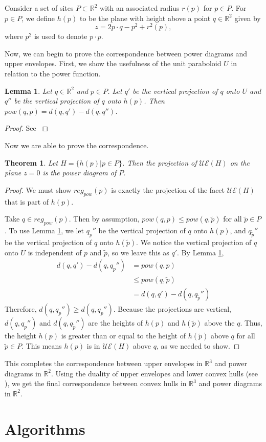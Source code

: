 \documentclass[12pt]{article}
\newtheorem{theorem}{Theorem}[section]
\newtheorem{lemma}{Lemma}[section]
\newcommand{\R}{\mathbb{R}}
\begin{document}
Consider a set of sites $P \subset \R^2$ with an associated radius $r(p)$ for $p \in P$. For $p \in P$, we define $h(p)$ to be the plane with height above a point
$q \in \R^2$ given by
\[ z = 2 p \cdot q - p^2 + r^2(p) ,\]
where $p^2$ is used to denote $p \cdot p$.

Now, we can begin to prove the correspondence between power diagrams and upper envelopes. First, we show the usefulness of the unit paraboloid $U$ in
relation to the power function.

\begin{lemma}
  \label{lem:proj}
  Let $q \in \R^2$ and $p \in P$. Let $q'$ be the vertical projection of $q$ onto $U$ and $q''$ be the vertical projection of $q$ onto $h(p)$. Then
  $pow(q, p) = d(q, q') - d(q, q'')$.
\end{lemma}
\begin{proof}
  See \cite{aurenhammer_power}
\end{proof}

Now we are able to prove the correspondence.

\begin{theorem}
  Let $H = \{ h(p) | p \in P \}$. Then the projection of $\mathcal{UE}(H)$ on the plane $z=0$ is the power diagram of $P$.
\end{theorem}
\begin{proof}
  We must show $reg_{pow}(p)$ is exactly the projection of the facet $\mathcal{UE}(H)$ that is part of $h(p)$.

  Take $q \in reg_{pow}(p)$. Then by assumption, $pow(q,p) \leq pow(q,\tilde{p})$ for all $\tilde{p} \in P$. To use Lemma \ref{lem:proj}, we let $q_p''$ be the
  vertical projection of $q$ onto $h(p)$, and $q_{\tilde{p}}''$ be the vertical projection of $q$ onto $h(\tilde{p})$. We notice the vertical projection
  of $q$ onto $U$ is independent of $p$ and $\tilde{p}$, so we leave this as $q'$. By Lemma \ref{lem:proj},
  \begin{align*}
    d(q,q') - d(q,q_p'') &= pow(q,p) \\
    &\leq pow(q,\tilde{p}) \\
    &= d(q,q') - d(q,q_{\tilde{p}}'')
  \end{align*}
  Therefore, $d(q,q_p'') \geq d(q, q_{\tilde{p}}'')$. Because the projections are vertical, $d(q,q_p'')$ and $d(q, q_{\tilde{p}}'')$ are the heights of
  $h(p)$ and $h(\tilde{p})$ above the $q$. Thus, the height $h(p)$ is greater than or equal to the height of $h(\tilde{p})$ above $q$ for all
  $\tilde{p} \in P$. This means $h(p)$ is in $\mathcal{UE}(H)$ above $q$, as we needed to show.
\end{proof}

This completes the correspondence between upper envelopes in $\R^3$ and power diagrams in $\R^2$. Using the duality of upper envelopes and lower convex hulls (see
\cite{comp_geom}), we get the final correspondence between convex hulls in $\R^3$ and power diagrams in $\R^2$.

\section{Algorithms}

\printbibliography
\end{document}
